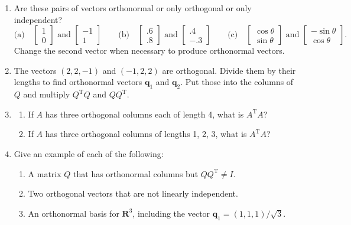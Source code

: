 \documentclass[14pt, a4paper]{article}
\begin{document}
\begin{enumerate}
    \item Are these pairs of vectors orthonormal or only orthogonal or only independent?
          \[
              \text{(a)} \quad \begin{bmatrix} 1 \\ 0 \end{bmatrix} \text{ and } \begin{bmatrix} -1 \\ 1 \end{bmatrix} \qquad
              \text{(b)} \quad \begin{bmatrix} .6 \\ .8 \end{bmatrix} \text{ and } \begin{bmatrix} .4 \\ -.3 \end{bmatrix} \qquad
              \text{(c)} \quad \begin{bmatrix} \cos\theta \\ \sin\theta \end{bmatrix} \text{ and } \begin{bmatrix} -\sin\theta \\ \cos\theta \end{bmatrix}.
          \]
          Change the second vector when necessary to produce orthonormal vectors.

    \item The vectors $(2, 2, -1)$ and $(-1, 2, 2)$ are orthogonal. Divide them by their lengths to find orthonormal vectors $\boldsymbol{q}_1$ and $\boldsymbol{q}_2$. Put those into the columns of $Q$ and multiply $Q^{\mathrm{T}}Q$ and $QQ^{\mathrm{T}}$.

    \item
          \begin{enumerate}
              \item If $A$ has three orthogonal columns each of length 4, what is $A^{\mathrm{T}}A$?
              \item If $A$ has three orthogonal columns of lengths 1, 2, 3, what is $A^{\mathrm{T}}A$?
          \end{enumerate}

    \item Give an example of each of the following:
          \begin{enumerate}
              \item A matrix $Q$ that has orthonormal columns but $QQ^{\mathrm{T}} \ne I$.
              \item Two orthogonal vectors that are not linearly independent.
              \item An orthonormal basis for $\mathbf{R}^3$, including the vector $\boldsymbol{q}_1 = (1, 1, 1)/\sqrt{3}$.
          \end{enumerate}


\end{enumerate}
\end{document}
